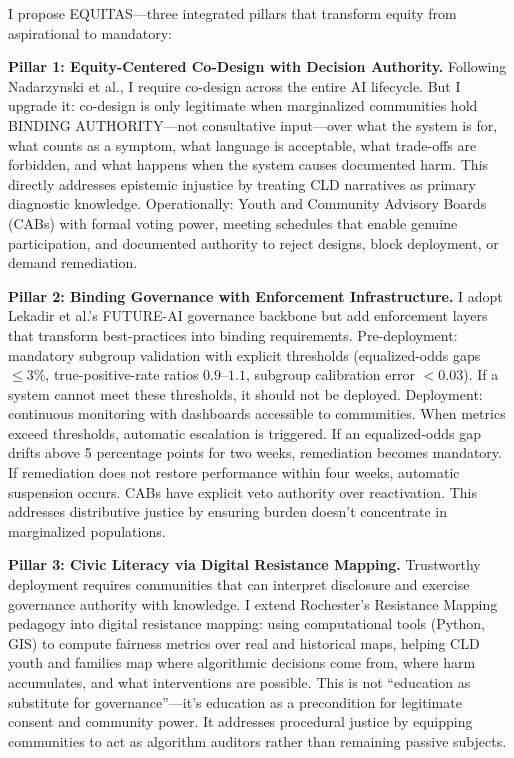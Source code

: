 \documentclass[12pt,a4paper]{article}
\begin{document}
I propose EQUITAS—three integrated pillars that transform equity from aspirational to mandatory:

\textbf{Pillar 1: Equity-Centered Co-Design with Decision Authority.} Following Nadarzynski et al., I require co-design across the entire AI lifecycle.\cite{nadarzynski2024} But I upgrade it: co-design is only legitimate when marginalized communities hold BINDING AUTHORITY—not consultative input—over what the system is for, what counts as a symptom, what language is acceptable, what trade-offs are forbidden, and what happens when the system causes documented harm. This directly addresses epistemic injustice by treating CLD narratives as primary diagnostic knowledge. Operationally: Youth and Community Advisory Boards (CABs) with formal voting power, meeting schedules that enable genuine participation, and documented authority to reject designs, block deployment, or demand remediation.

\textbf{Pillar 2: Binding Governance with Enforcement Infrastructure.} I adopt Lekadir et al.'s FUTURE-AI governance backbone but add enforcement layers that transform best-practices into binding requirements.\cite{lekadir2025} Pre-deployment: mandatory subgroup validation with explicit thresholds (equalized-odds gaps $\leq 3\%$, true-positive-rate ratios $0.9$--$1.1$, subgroup calibration error $< 0.03$).\cite{chen2023} If a system cannot meet these thresholds, it should not be deployed. Deployment: continuous monitoring with dashboards accessible to communities. When metrics exceed thresholds, automatic escalation is triggered. If an equalized-odds gap drifts above 5 percentage points for two weeks, remediation becomes mandatory. If remediation does not restore performance within four weeks, automatic suspension occurs. CABs have explicit veto authority over reactivation. This addresses distributive justice by ensuring burden doesn't concentrate in marginalized populations.

\textbf{Pillar 3: Civic Literacy via Digital Resistance Mapping.} Trustworthy deployment requires communities that can interpret disclosure and exercise governance authority with knowledge. I extend Rochester's Resistance Mapping pedagogy into digital resistance mapping: using computational tools (Python, GIS) to compute fairness metrics over real and historical maps, helping CLD youth and families map where algorithmic decisions come from, where harm accumulates, and what interventions are possible. This is not ``education as substitute for governance''—it's education as a precondition for legitimate consent and community power. It addresses procedural justice by equipping communities to act as algorithm auditors rather than remaining passive subjects.
\end{document}
